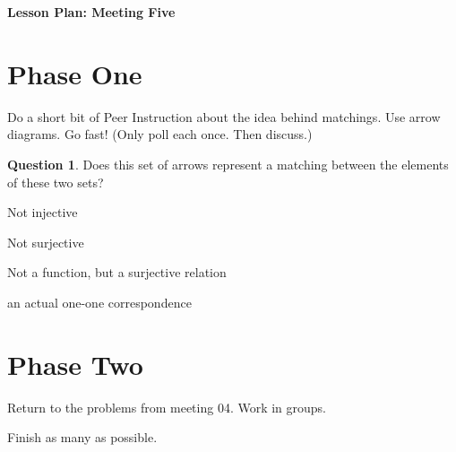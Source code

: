 \documentclass[12pt]{amsart}
\theoremstyle{definition}
\newtheorem{question}{Question}
\begin{document}
\begin{center}
\textbf{\Huge
Lesson Plan: Meeting Five
}
\end{center}
\vspace{.5in}

\section*{Phase One}

Do a short bit of Peer Instruction about the idea behind matchings. 
Use arrow diagrams.
Go fast!
(Only poll each once.
Then discuss.)

\begin{question}
Does this set of arrows represent a matching between the elements of these two sets?
\end{question}

\begin{compactitem}
\item Not injective
\item Not surjective
\item Not a function, but a surjective relation
\item an actual one-one correspondence
\end{compactitem}

\section*{Phase Two}
Return to the problems from meeting 04.
Work in groups.

Finish as many as possible.
\end{document}
